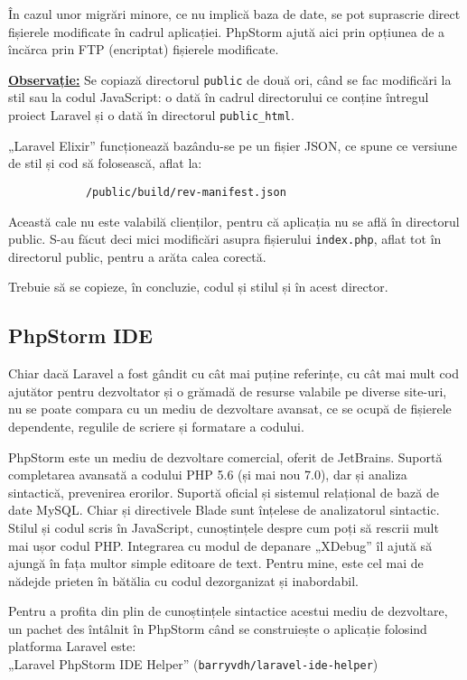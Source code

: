 		În cazul unor migrări minore, ce nu implică baza de date, se pot suprascrie direct fișierele modificate în cadrul aplicației.
		PhpStorm ajută aici prin opțiunea de a încărca prin FTP (encriptat) fișierele modificate.

		\textbf{\underline{Observație:}} Se copiază directorul \verb|public| de două ori, când se fac modificări la stil sau la codul JavaScript: o dată în cadrul directorului ce conține întregul proiect Laravel și o dată în directorul \verb|public_html|.

		„Laravel Elixir” funcționează bazându-se pe un fișier JSON, ce spune ce versiune de stil și cod să folosească, aflat la:
		\begin{verbatim}
			/public/build/rev-manifest.json
		\end{verbatim}

		Această cale nu este valabilă clienților, pentru că aplicația nu se află în directorul public.
		S-au făcut deci mici modificări asupra fișierului \verb|index.php|, aflat tot în directorul public, pentru a arăta calea corectă.

		Trebuie să se copieze, în concluzie, codul și stilul și în acest director.

	\subsection{PhpStorm IDE}

		Chiar dacă Laravel a fost gândit cu cât mai puține referințe, cu cât mai mult cod ajutător pentru dezvoltator și o grămadă de resurse valabile pe diverse site-uri, nu se poate compara cu un mediu de dezvoltare avansat, ce se ocupă de fișierele dependente, regulile de scriere și formatare a codului.

		PhpStorm este un mediu de dezvoltare comercial, oferit de JetBrains. Suportă completarea avansată a codului PHP 5.6 (și mai nou 7.0), dar și analiza sintactică, prevenirea erorilor.
		Suportă oficial și sistemul relațional de bază de date MySQL.
		Chiar și directivele Blade sunt înțelese de analizatorul sintactic.
		Stilul și codul scris în JavaScript, cunoștințele despre cum poți să rescrii mult mai ușor codul PHP.
		Integrarea cu modul de depanare „XDebug” îl ajută să ajungă în fața multor simple editoare de text.
		Pentru mine, este cel mai de nădejde prieten în bătălia cu codul dezorganizat și inabordabil.

		Pentru a profita din plin de cunoștințele sintactice acestui mediu de dezvoltare, un pachet des întâlnit în PhpStorm când se construiește o aplicație folosind platforma Laravel este: \\
		„Laravel PhpStorm IDE Helper” (\verb|barryvdh/laravel-ide-helper|)


